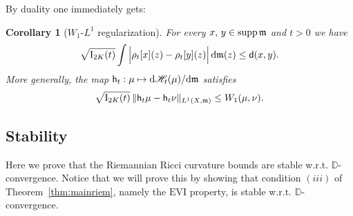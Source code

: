 \documentclass[reqno,11pt]{article}
\numberwithin{equation}{section}
\newcommand{\C}{\mathbb{C}}
\newcommand{\D}{\mathbb{D}}
\newcommand{\mm}{{\mbox{\boldmath$m$}}}
\newcommand{\sfd}{{\sf d}}
\newcommand{\sfh}{{\sf h}}
\newcommand{\supp}{\mathop{\rm supp}\nolimits}   %
\renewcommand{\d}{{\mathrm d}}
\newcommand{\EVI}[4]{\mathrm{EVI}_{#4}(#1,{#2}_W,#3)}
\newtheorem{corollary}[theorem]{Corollary}
\renewcommand{\C}{{\rm Ch}}
\newcommand{\heatw}{{\mathscr H}}
\newcommand{\ked}[2]{\rho_{#2}[#1]}\renewcommand{\C}{{\sf Ch}}
\renewcommand{\EVI}{\ensuremath{\mathrm{EVI}}}
\renewcommand{\mm}{\mathfrak m}
\begin{document}
By duality one immediately gets:

\begin{corollary} [$W_1$-$L^1$ regularization]
  For every $x,\,y\in\supp\mm$ and $t>0$ we have
  \begin{equation}
    \label{eq:16}
    \sqrt{\mathrm I_{2K}(t)}\int \Big|\ked xt(z)-\ked yt(z)\Big|\,\d\mm(z)\le
    \sfd(x,y).
  \end{equation}
  More generally, the map $\sfh_t:\mu\mapsto
  {\d\heatw_t(\mu)}/{\d\mm}$ satisfies
  \begin{equation}
    \label{eq:23}
    \sqrt{\mathrm I_{2K}(t)}\,\|\sfh_t\mu-\sfh_t\nu\|_{L^1(X,\mm)}\le
    W_1(\mu,\nu).
  \end{equation}
\end{corollary}


\subsection{Stability}

Here we prove that the Riemannian Ricci curvature bounds are stable
w.r.t. $\D$-convergence. Notice that we will prove this by showing
that condition $(iii)$ of Theorem~\ref{thm:mainriem}, namely the
$\EVI$ property, is stable w.r.t. $\D$-convergence.
\end{document}
